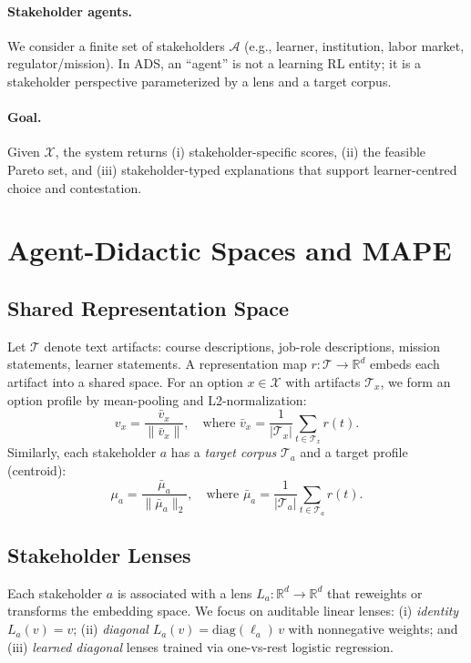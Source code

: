 \documentclass[sigconf,review]{acmart}
\newcommand{\ADS}{\textsc{ADS}\xspace}
\newcommand{\MAPE}{\textsc{MAPE}\xspace}
\begin{document}
\paragraph{Stakeholder agents.}
We consider a finite set of stakeholders $\mathcal{A}$ (e.g., learner, institution, labor market, regulator/mission). In \ADS, an ``agent'' is not a learning RL entity; it is a stakeholder perspective parameterized by a lens and a target corpus.

\paragraph{Goal.}
Given $\mathcal{X}$, the system returns (i) stakeholder-specific scores, (ii) the feasible Pareto set, and (iii) stakeholder-typed explanations that support learner-centred choice and contestation.


\section{Agent-Didactic Spaces and \MAPE}
\label{sec:method}

\subsection{Shared Representation Space}
Let $\mathcal{T}$ denote text artifacts: course descriptions, job-role descriptions, mission statements, learner statements. A representation map $r:\mathcal{T}\to\mathbb{R}^d$ embeds each artifact into a shared space. For an option $x\in\mathcal{X}$ with artifacts $\mathcal{T}_x$, we form an option profile by mean-pooling and L2-normalization:
\begin{equation}
  v_x = \frac{\bar{v}_x}{\|\bar{v}_x\|}, \quad \text{where } \bar{v}_x = \frac{1}{|\mathcal{T}_x|}\sum_{t\in\mathcal{T}_x} r(t).
\end{equation}
Similarly, each stakeholder $a$ has a \emph{target corpus} $\mathcal{T}_a$ and a target profile (centroid):
\begin{equation}
  \mu_a = \frac{\bar{\mu}_a}{\|\bar{\mu}_a\|_2}, \quad \text{where } \bar{\mu}_a = \frac{1}{|\mathcal{T}_a|}\sum_{t\in\mathcal{T}_a} r(t).
\end{equation}

\subsection{Stakeholder Lenses}
Each stakeholder $a$ is associated with a lens $L_a:\mathbb{R}^d \to \mathbb{R}^d$ that reweights or transforms the embedding space. We focus on auditable linear lenses: (i) \emph{identity} $L_a(v)=v$; (ii) \emph{diagonal} $L_a(v)=\mathrm{diag}(\ell_a)\,v$ with nonnegative weights; and (iii) \emph{learned diagonal} lenses trained via one-vs-rest logistic regression.
\end{document}
